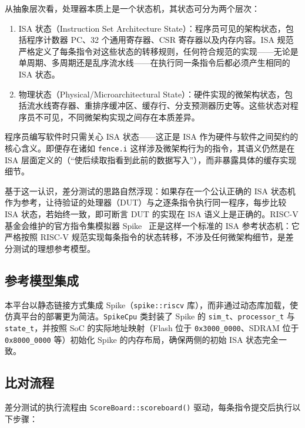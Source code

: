 从抽象层次看，处理器本质上是一个状态机，其状态可分为两个层次：

\begin{enumerate}
  \item ISA 状态（Instruction Set Architecture State）：程序员可见的架构状态，包括程序计数器 PC、32 个通用寄存器、CSR 寄存器以及内存内容。ISA 规范严格定义了每条指令对这些状态的转移规则，任何符合规范的实现——无论是单周期、多周期还是乱序流水线——在执行同一条指令后都必须产生相同的 ISA 状态。
  \item 物理状态（Physical/Microarchitectural State）：硬件实现的微架构状态，包括流水线寄存器、重排序缓冲区、缓存行、分支预测器历史等。这些状态对程序员不可见，不同微架构实现之间存在本质差异。
\end{enumerate}

程序员编写软件时只需关心 ISA 状态——这正是 ISA 作为硬件与软件之间契约的核心含义。即便存在诸如 \lstinline|fence.i| 这样涉及微架构行为的指令，其语义仍然是在 ISA 层面定义的（“使后续取指看到此前的数据写入”），而非暴露具体的缓存实现细节。

基于这一认识，差分测试的思路自然浮现：如果存在一个公认正确的 ISA 状态机作为参考，让待验证的处理器（DUT）与之逐条指令执行同一程序，每步比较 ISA 状态，若始终一致，即可断言 DUT 的实现在 ISA 语义上是正确的。RISC-V 基金会维护的官方指令集模拟器 Spike~\cite{spike2026} 正是这样一个标准的 ISA 参考状态机：它严格按照 RISC-V 规范实现每条指令的状态转移，不涉及任何微架构细节，是差分测试的理想参考模型。

\subsection{参考模型集成}

本平台以静态链接方式集成 Spike（\lstinline|spike::riscv| 库），而非通过动态库加载，使仿真平台的部署更为简洁。\lstinline|SpikeCpu| 类封装了 Spike 的 \lstinline|sim_t|、\lstinline|processor_t| 与 \lstinline|state_t|，并按照 SoC 的实际地址映射（Flash 位于 \lstinline|0x3000_0000|、SDRAM 位于 \lstinline|0x8000_0000| 等）初始化 Spike 的内存布局，确保两侧的初始 ISA 状态完全一致。

\subsection{比对流程}

差分测试的执行流程由 \lstinline|ScoreBoard::scoreboard()| 驱动，每条指令提交后执行以下步骤：

